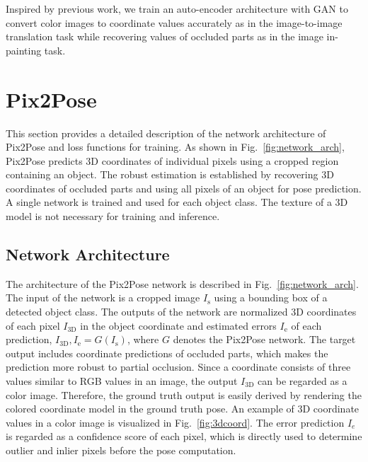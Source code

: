 \documentclass[10pt,twocolumn,letterpaper]{article}
\begin{document}
Inspired by previous work, we train an auto-encoder architecture with GAN to convert color images to coordinate values accurately as in the image-to-image translation task while recovering values of occluded parts as in the image in-painting task. 


\section{Pix2Pose} \label{method}
This section provides a detailed description of the network architecture of Pix2Pose and loss functions for training. As shown in Fig.~\ref{fig:network_arch}, Pix2Pose predicts 3D coordinates of individual pixels using a cropped region containing an object. The robust estimation is established by recovering 3D coordinates of occluded parts and using all pixels of an object for pose prediction. A single network is trained and used for each object class. The texture of a 3D model is not necessary for training and inference.
  
  
\subsection{Network Architecture}
The architecture of the Pix2Pose network is described in Fig.~\ref{fig:network_arch}.
The input of the network is a cropped image $I_\textrm{s}$ using a bounding box of a detected object class. The outputs of the network are normalized 3D coordinates of each pixel $I_\textrm{3D}$ in the object coordinate and estimated errors $I_\textrm{e}$ of each prediction, $I_\textrm{3D},I_\textrm{e} = G(I_\textrm{s})$, where $G$ denotes the Pix2Pose network. The target output includes coordinate predictions of occluded parts, which makes the prediction more robust to partial occlusion. Since a coordinate consists of three values similar to RGB values in an image, the output $I_\textrm{3D}$ can be regarded as a color image. Therefore, the ground truth output is easily derived by rendering the colored coordinate model in the ground truth pose. An example of 3D coordinate values in a color image is visualized in Fig.~\ref{fig:3dcoord}. The error prediction $I_{e}$ is regarded as a confidence score of each pixel, which is directly used to determine outlier and inlier pixels before the pose computation.
\end{document}
